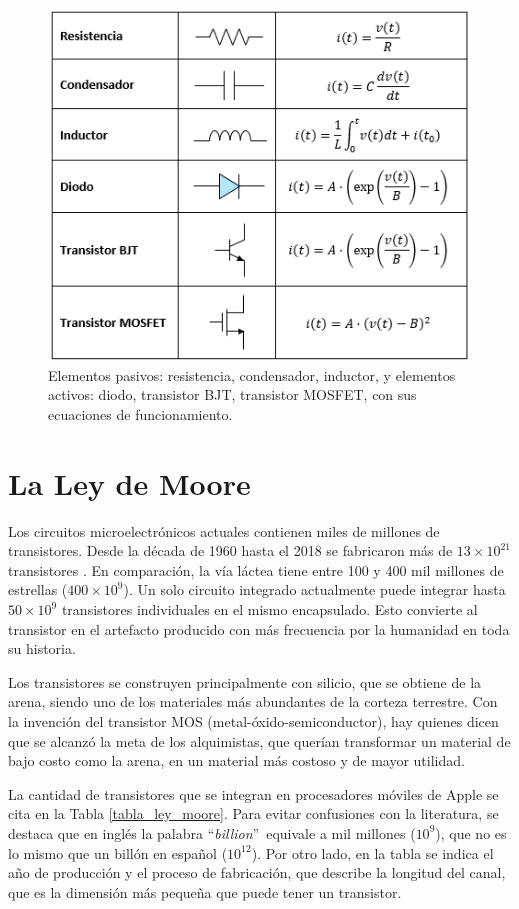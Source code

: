 \begin{figure}[H]
\centering
\includegraphics{figuras/elem_pasivos_activos.png}
\caption{Elementos pasivos: resistencia, condensador, inductor, y elementos activos: diodo, transistor BJT, transistor MOSFET, con sus ecuaciones de funcionamiento.}
\label{elem_pasivos_activos}
\end{figure}

\section{La Ley de Moore}

Los circuitos microelectrónicos actuales contienen miles de millones de transistores. Desde la década de 1960 hasta el 2018 se fabricaron más de $13\times{}10^{21}$ transistores \cite{laws2018}. En comparación, la vía láctea tiene entre 100 y 400 mil millones de estrellas ($400\times{}10^9$). Un solo circuito integrado actualmente puede integrar hasta $50\times{}10^9$ transistores individuales en el mismo encapsulado. Esto convierte al transistor en el artefacto producido con más frecuencia por la humanidad en toda su historia.

Los transistores se construyen principalmente con silicio, que se obtiene de la arena, siendo uno de los materiales más abundantes de la corteza terrestre. Con la invención del transistor MOS (metal-óxido-semiconductor), hay quienes dicen que se alcanzó la meta de los alquimistas, que querían transformar un material de bajo costo como la arena, en un material más costoso y de mayor utilidad.

La cantidad de transistores que se integran en procesadores móviles de Apple se cita en la Tabla \ref{tabla_ley_moore}. Para evitar confusiones con la literatura, se destaca que en inglés la palabra ``\textit{billion}''\ equivale a mil millones ($10^9$), que no es lo mismo que un billón en español ($10^{12}$). Por otro lado, en la tabla se indica el año de producción y el proceso de fabricación, que describe la longitud del canal, que es la dimensión más pequeña que puede tener un transistor.

